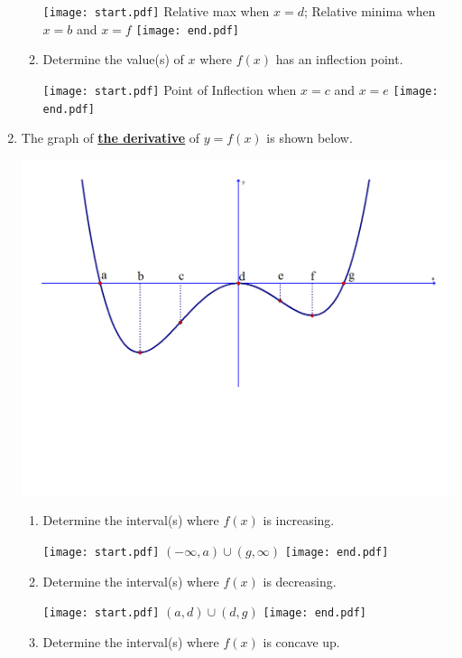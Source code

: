 \documentclass[12pt]{article}
\begin{document}
\begin{enumerate}
\begin{enumerate}
\texttt{[image: start.pdf]}
{{Relative max when $x=d$; Relative minima when $x=b$ and $x=f$}}
\texttt{[image: end.pdf]}


\item Determine the value(s) of $x$ where $f(x)$ has an inflection point.

\texttt{[image: start.pdf]}
{{Point of Inflection when $x=c$ and $x=e$}}
\texttt{[image: end.pdf]}


\end{enumerate}

\item The graph of \underline{\bf the derivative} of $y=f(x)$ is shown below.

\begin{center}
\includegraphics[scale=0.5]{graph.pdf}
\end{center}

\begin{enumerate}

\item Determine the interval(s) where $f(x)$ is increasing.

\texttt{[image: start.pdf]}
{{$(-\infty,a) \cup (g,\infty)$}}
\texttt{[image: end.pdf]}


\item Determine the interval(s) where $f(x)$ is decreasing.

\texttt{[image: start.pdf]}
{{$(a,d) \cup (d,g)$}}
\texttt{[image: end.pdf]}


\item Determine the interval(s) where $f(x)$ is concave up.


\end{enumerate}
\end{enumerate}
\end{document}
